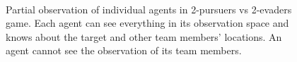 \documentclass[conference]{IEEEtran}
\begin{document}
\begin{figure}[t]
        \vspace{1mm}
         \hspace{2mm}
        \\
        \vspace{1mm}
     \caption{Partial observation of individual agents in 2-pursuers vs 2-evaders game. Each agent can see everything in its observation space and knows about the target and other team members' locations. An agent cannot see the observation of its team members.}
     \label{fig:partial_obs}
\end{figure}
\end{document}
